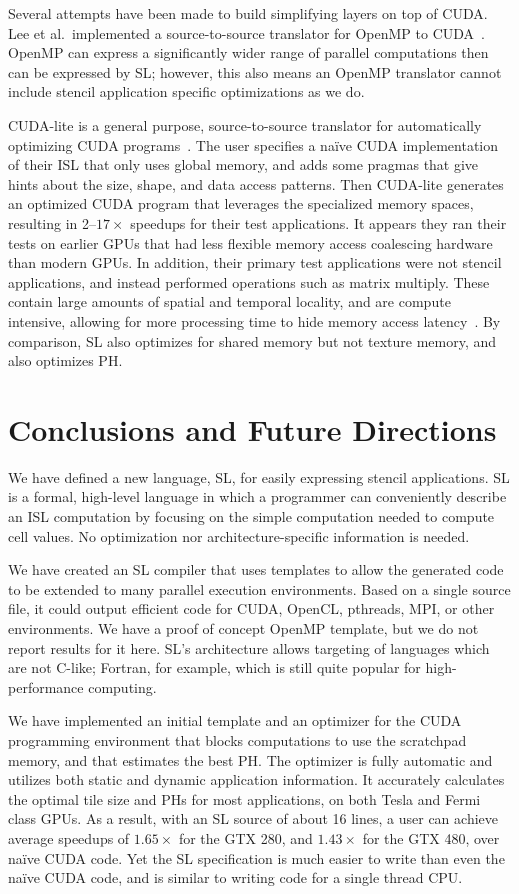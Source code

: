 \documentclass{sig-alternate}
\begin{document}
Several attempts have been made to build simplifying layers on top of CUDA.
Lee et al.\ implemented a source-to-source translator for OpenMP to
CUDA~\cite{openmp2gpu}.  OpenMP can express a significantly wider range of
parallel computations then can be expressed by SL; however, this also means
an OpenMP translator cannot include stencil application specific
optimizations as we do.

CUDA-lite is a general purpose, source-to-source translator for automatically
optimizing CUDA programs~\cite{cudalite}.  The user specifies a na\"{i}ve
CUDA implementation of their ISL that only uses global memory, and adds some
pragmas that give hints about the size, shape, and data access patterns.
Then CUDA-lite generates an optimized CUDA program that leverages the
specialized memory spaces, resulting in 2--$17\times$ speedups for their test
applications.  It appears they ran their tests on earlier GPUs that had less
flexible memory access coalescing hardware than modern GPUs.  In addition,
their primary test applications were not stencil applications, and instead
performed operations such as matrix multiply. These contain large amounts of
spatial and temporal locality, and are compute intensive, allowing for more
processing time to hide memory access latency~\cite{Ryoo}. By comparison, SL
also optimizes for shared memory but not texture memory, and also optimizes
PH.

\section{Conclusions and Future Directions}

We have defined a new language, SL, for easily expressing stencil
applications.  SL is a formal, high-level language in which a programmer can
conveniently describe an ISL computation by focusing on the simple
computation needed to compute cell values.  No optimization nor
architecture-specific information is needed.

We have created an SL compiler that uses templates to allow the generated
code to be extended to many parallel execution environments.  Based on a
single source file, it could output efficient code for CUDA, OpenCL,
pthreads, MPI, or other environments.  We have a proof of concept OpenMP
template, but we do not report results for it here.  SL's architecture allows
targeting of languages which are not C-like; Fortran, for example, which is
still quite popular for high-performance computing.

We have implemented an initial template and an optimizer for the CUDA
programming environment that blocks computations to use the scratchpad
memory, and that estimates the best PH.  The optimizer is fully automatic and
utilizes both static and dynamic application information.  It accurately
calculates the optimal tile size and PHs for most applications, on both Tesla
and Fermi class GPUs.  As a result, with an SL source of about 16 lines, a
user can achieve average speedups of $1.65\times$ for the GTX 280, and
$1.43\times$ for the GTX 480, over na\"{i}ve CUDA code.  Yet the SL
specification is much easier to write than even the na\"{i}ve CUDA code, and
is similar to writing code for a single thread CPU.
\end{document}
